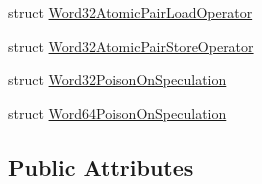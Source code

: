 \begin{DoxyCompactItemize}
struct \mbox{\hyperlink{structv8_1_1internal_1_1compiler_1_1MachineOperatorGlobalCache_1_1Word32AtomicPairLoadOperator}{Word32\+Atomic\+Pair\+Load\+Operator}}
\item 
struct \mbox{\hyperlink{structv8_1_1internal_1_1compiler_1_1MachineOperatorGlobalCache_1_1Word32AtomicPairStoreOperator}{Word32\+Atomic\+Pair\+Store\+Operator}}
\item 
struct \mbox{\hyperlink{structv8_1_1internal_1_1compiler_1_1MachineOperatorGlobalCache_1_1Word32PoisonOnSpeculation}{Word32\+Poison\+On\+Speculation}}
\item 
struct \mbox{\hyperlink{structv8_1_1internal_1_1compiler_1_1MachineOperatorGlobalCache_1_1Word64PoisonOnSpeculation}{Word64\+Poison\+On\+Speculation}}
\end{DoxyCompactItemize}
\subsection*{Public Attributes}
